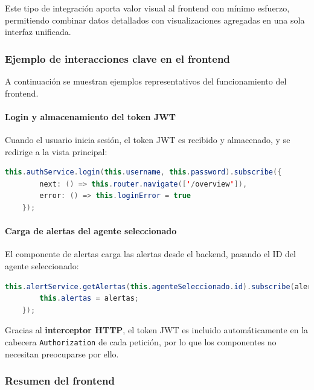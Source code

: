 \documentclass[11pt,a4paper,twoside]{report}
\begin{document}
Este tipo de integración aporta valor visual al frontend con mínimo esfuerzo, permitiendo combinar datos detallados con visualizaciones agregadas en una sola interfaz unificada.

\subsubsection{Ejemplo de interacciones clave en el frontend}

A continuación se muestran ejemplos representativos del funcionamiento del frontend.

\paragraph{Login y almacenamiento del token JWT}

Cuando el usuario inicia sesión, el token JWT es recibido y almacenado, y se redirige a la vista principal:

\begin{lstlisting}[language=Java, caption={Login y navegación tras autenticación}, label={lst:frontend-login}]
	this.authService.login(this.username, this.password).subscribe({
		next: () => this.router.navigate(['/overview']),
		error: () => this.loginError = true
	});
\end{lstlisting}

\paragraph{Carga de alertas del agente seleccionado}

El componente de alertas carga las alertas desde el backend, pasando el ID del agente seleccionado:

\begin{lstlisting}[language=Java, caption={Carga de alertas desde el servicio}, label={lst:frontend-alertas}]
	this.alertService.getAlertas(this.agenteSeleccionado.id).subscribe(alertas => {
		this.alertas = alertas;
	});
\end{lstlisting}

Gracias al \textbf{interceptor HTTP}, el token JWT es incluido automáticamente en la cabecera \texttt{Authorization} de cada petición, por lo que los componentes no necesitan preocuparse por ello.

\subsubsection{Resumen del frontend}
\end{document}
